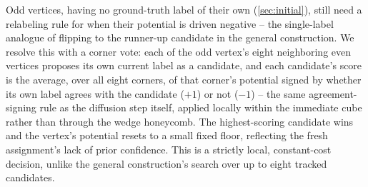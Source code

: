 \documentclass[journal]{vgtc}                     %
\begin{document}
Odd vertices, having no ground-truth label of their own (\cref{sec:initial}), still need a relabeling rule for when their potential is driven negative -- the single-label analogue of flipping to the runner-up candidate in the general construction. We resolve this with a corner vote: each of the odd vertex's eight neighboring even vertices proposes its own current label as a candidate, and each candidate's score is the average, over all eight corners, of that corner's potential signed by whether its own label agrees with the candidate ($+1$) or not ($-1$) -- the same agreement-signing rule as the diffusion step itself, applied locally within the immediate cube rather than through the wedge honeycomb. The highest-scoring candidate wins and the vertex's potential resets to a small fixed floor, reflecting the fresh assignment's lack of prior confidence. This is a strictly local, constant-cost decision, unlike the general construction's search over up to eight tracked candidates.
\end{document}
